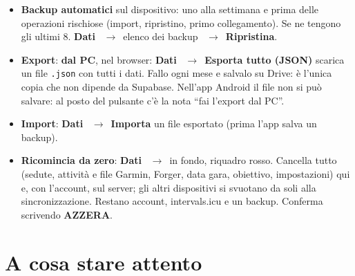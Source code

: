 \documentclass[11pt,a4paper]{article}
\newcommand{\ra}{\unskip\nobreak\ $\rightarrow$\ \ignorespaces}            %
\newcommand{\bt}[1]{\textbf{#1}}               %
\newcommand{\code}[1]{\texttt{#1}}             %
\begin{document}
\begin{itemize}
  \item \bt{Backup automatici} sul dispositivo: uno alla settimana e prima delle operazioni
    rischiose (import, ripristino, primo collegamento). Se ne tengono gli ultimi 8.
    \bt{Dati} \ra elenco dei backup \ra \bt{Ripristina}.
  \item \bt{Export}: \bt{dal PC}, nel browser: \bt{Dati} \ra \bt{Esporta tutto (JSON)} scarica un
    file \code{.json} con tutti i dati. Fallo ogni mese e salvalo su Drive: è l'unica copia che non
    dipende da Supabase. Nell'app Android il file non si può salvare: al posto del pulsante c'è la
    nota ``fai l'export dal PC''.
  \item \bt{Import}: \bt{Dati} \ra \bt{Importa} un file esportato (prima l'app salva un backup).
  \item \bt{Ricomincia da zero}: \bt{Dati} \ra in fondo, riquadro rosso. Cancella tutto (sedute,
    attività e file Garmin, Forger, data gara, obiettivo, impostazioni) qui e, con l'account, sul
    server; gli altri dispositivi si svuotano da soli alla sincronizzazione. Restano account,
    intervals.icu e un backup. Conferma scrivendo \bt{AZZERA}.
\end{itemize}

\section{A cosa stare attento}\label{sec:attento}
\end{document}
